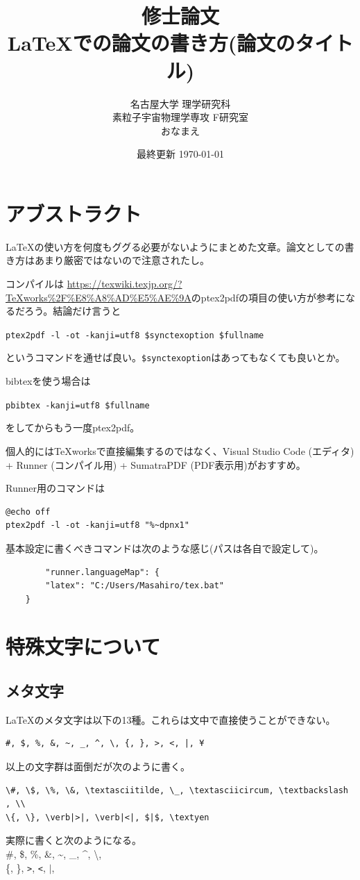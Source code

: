 \documentclass[a4j]{jsarticle}
\title{\vspace{60mm} \LARGE 修士論文\vspace{10mm}\\LaTeXでの論文の書き方(論文のタイトル)}
\author{\Large 名古屋大学 理学研究科 \\ \vspace{5mm}
\Large 素粒子宇宙物理学専攻 F研究室 \\ \vspace{5mm}
\LARGE おなまえ}
\date{最終更新 \today}
\begin{document}
\maketitle
\thispagestyle{empty} %
\newpage %
\tableofcontents %
\newpage %
\section*{アブストラクト}
\LaTeX の使い方を何度もググる必要がないようにまとめた文章。論文としての書き方はあまり厳密ではないので注意されたし。

コンパイルは \url{https://texwiki.texjp.org/?TeXworks%2F%E8%A8%AD%E5%AE%9A}のptex2pdfの項目の使い方が参考になるだろう。結論だけ言うと 

\verb|ptex2pdf -l -ot -kanji=utf8 $synctexoption $fullname|

\noindent
というコマンドを通せば良い。\verb|$synctexoption|はあってもなくても良いとか。

bibtexを使う場合は

\verb|pbibtex -kanji=utf8 $fullname|

\noindent
をしてからもう一度ptex2pdf。

個人的にはTeXworksで直接編集するのではなく、Visual Studio Code (エディタ) + Runner (コンパイル用) + SumatraPDF (PDF表示用)がおすすめ。

Runner用のコマンドは
\begin{verbatim}
@echo off
ptex2pdf -l -ot -kanji=utf8 "%~dpnx1"
\end{verbatim}

基本設定に書くべきコマンドは次のような感じ(パスは各自で設定して)。
\begin{verbatim}
        "runner.languageMap": {
        "latex": "C:/Users/Masahiro/tex.bat"
    }
\end{verbatim}

\newpage %
\section{特殊文字について}
\subsection{メタ文字}
\LaTeX のメタ文字は以下の13種。これらは文中で直接使うことができない。
\begin{verbatim}
#, $, %, &, ~, _, ^, \, {, }, >, <, |, ¥
\end{verbatim}
以上の文字群は面倒だが次のように書く。
\begin{verbatim}
\#, \$, \%, \&, \textasciitilde, \_, \textasciicircum, \textbackslash , \\
\{, \}, \verb|>|, \verb|<|, $|$, \textyen
\end{verbatim}
実際に書くと次のようになる。\\
\#, \$, \%, \&, \textasciitilde, \_, \textasciicircum, \textbackslash , \\
\{, \}, \verb|>|, \verb|<|, $|$, \textyen
\end{document}
